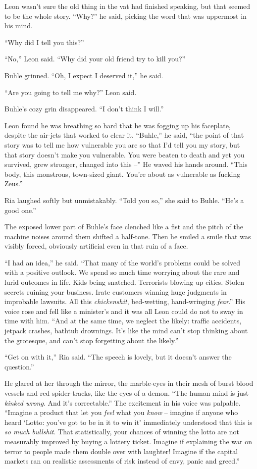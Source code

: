 Leon wasn't sure the old thing in the vat had finished speaking, but 
that seemed to be the whole story. “Why?” he said, picking the word 
that was uppermost in his mind.

“Why did I tell you this?”

“No,” Leon said. “Why did your old friend try to kill you?”

Buhle grinned. “Oh, I expect I deserved it,” he said.

“Are you going to tell me why?” Leon said.

Buhle's cozy grin disappeared. “I don't think I will.”

Leon found he was breathing so hard that he was fogging up his 
faceplate, despite the air-jets that worked to clear it. “Buhle,” 
he said, “the point of that story was to tell me how vulnerable you 
are so that I'd tell you my story, but that story doesn't make you 
vulnerable. You were beaten to death and yet you survived, grew 
stronger, changed into this --” He waved his hands around. “This 
body, this monstrous, town-sized giant. You're about as vulnerable as 
fucking Zeus.”

Ria laughed softly but unmistakably. “Told you so,” she said to 
Buhle. “He's a good one.”

The exposed lower part of Buhle's face clenched like a fist and the 
pitch of the machine noises around them shifted a half-tone. Then he 
smiled a smile that was visibly forced, obviously artificial even in 
that ruin of a face.

“I had an idea,” he said. “That many of the world's problems 
could be solved with a positive outlook. We spend so much time worrying 
about the rare and lurid outcomes in life. Kids being snatched. 
Terrorists blowing up cities. Stolen secrets ruining your business. 
Irate customers winning huge judgments in improbable lawsuits. All this 
\emph{chickenshit}, bed-wetting, hand-wringing \emph{fear}.” His 
voice rose and fell like a minister's and it was all Leon could do not 
to sway in time with him. “And at the same time, we neglect the 
likely: traffic accidents, jetpack crashes, bathtub drownings. It's 
like the mind can't stop thinking about the grotesque, and can't stop 
forgetting about the likely.”

“Get on with it,” Ria said. “The speech is lovely, but it doesn't 
answer the question.”

He glared at her through the mirror, the marble-eyes in their mesh of 
burst blood vessels and red spider-tracks, like the eyes of a demon. 
“The human mind is just \emph{kinked wrong}. And it's correctable.” 
The excitement in his voice was palpable. “Imagine a product that let 
you \emph{feel} what you \emph{know} -- imagine if anyone who heard 
`Lotto: you've got to be in it to win it' immediately understood that 
this is \emph{so much bullshit}. That statistically, your chances of 
winning the lotto are not measurably improved by buying a lottery 
ticket. Imagine if explaining the war on terror to people made them 
double over with laughter! Imagine if the capital markets ran on 
realistic assessments of risk instead of envy, panic and greed.”

